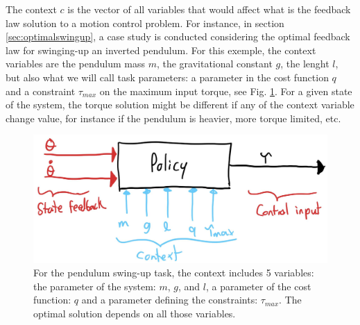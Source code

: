The context $c$ is the vector of all variables that would affect what is the feedback law solution to a motion control problem. For instance, in section \ref{sec:optimalswingup}, a case study is conducted considering the optimal feedback law for swinging-up an inverted pendulum. For this exemple, the context variables are the pendulum mass $m$, the gravitational constant $g$, the lenght $l$, but also what we will call task parameters: a parameter in the cost function $q$ and a constraint $\tau_{max}$ on the maximum input torque, see Fig. \ref{fig:policy_context}. For a given state of the system, the torque solution might be different if any of the context variable change value, for instance if the pendulum is heavier, more torque limited, etc.
\begin{figure}[h]
\vspace{-5pt}
\begin{center}
\includegraphics[width=0.95\linewidth]{fig/policy_context.jpg}
\caption{For the pendulum swing-up task, the context includes 5 variables: the parameter of the system: $m$, $g$, and $l$, a parameter of the cost function: $q$ and a parameter defining the constraints: $\tau_{max}$. The optimal solution depends on all those variables.
}\label{fig:policy_context}
\end{center}
\vspace{-5pt}
\end{figure}

